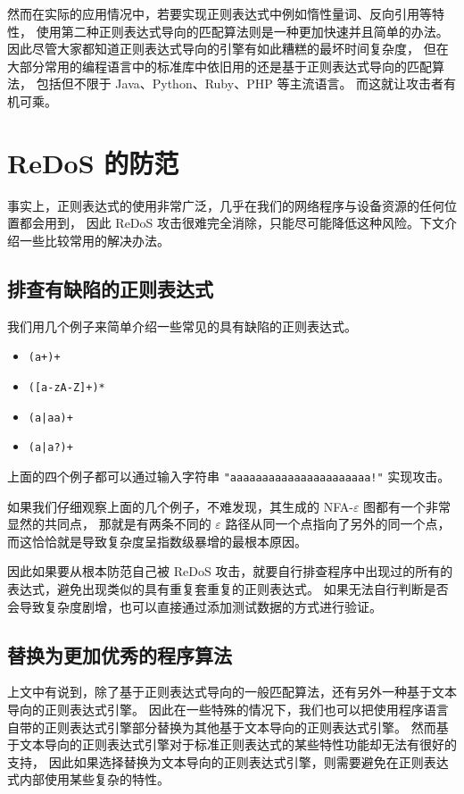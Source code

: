 \documentclass[hyperref,UTF8,12pt,a4paper]{ctexart}
\begin{document}
然而在实际的应用情况中，若要实现正则表达式中例如惰性量词、反向引用等特性，
使用第二种正则表达式导向的匹配算法则是一种更加快速并且简单的办法。
因此尽管大家都知道正则表达式导向的引擎有如此糟糕的最坏时间复杂度，
但在大部分常用的编程语言中的标准库中依旧用的还是基于正则表达式导向的匹配算法，
包括但不限于 Java、Python、Ruby、PHP 等主流语言。
而这就让攻击者有机可乘。

\section{ReDoS 的防范}

事实上，正则表达式的使用非常广泛，几乎在我们的网络程序与设备资源的任何位置都会用到，
因此 ReDoS 攻击很难完全消除，只能尽可能降低这种风险。下文介绍一些比较常用的解决办法。

\subsection{排查有缺陷的正则表达式}

我们用几个例子来简单介绍一些常见的具有缺陷的正则表达式。

\begin{itemize}
	\item \verb|(a+)+|
	\item \verb|([a-zA-Z]+)*|
	\item \verb!(a|aa)+!
	\item \verb!(a|a?)+!
\end{itemize}

上面的四个例子都可以通过输入字符串 \verb|"aaaaaaaaaaaaaaaaaaaaaa!"| 实现攻击。

如果我们仔细观察上面的几个例子，不难发现，其生成的 NFA-$\varepsilon$ 图都有一个非常显然的共同点，
那就是有两条不同的 $\varepsilon$ 路径从同一个点指向了另外的同一个点，
而这恰恰就是导致复杂度呈指数级暴增的最根本原因。

因此如果要从根本防范自己被 ReDoS 攻击，就要自行排查程序中出现过的所有的表达式，避免出现类似的具有重复套重复的正则表达式。
如果无法自行判断是否会导致复杂度剧增，也可以直接通过添加测试数据的方式进行验证。

\subsection{替换为更加优秀的程序算法}

上文中有说到，除了基于正则表达式导向的一般匹配算法，还有另外一种基于文本导向的正则表达式引擎。
因此在一些特殊的情况下，我们也可以把使用程序语言自带的正则表达式引擎部分替换为其他基于文本导向的正则表达式引擎。
然而基于文本导向的正则表达式引擎对于标准正则表达式的某些特性功能却无法有很好的支持，
因此如果选择替换为文本导向的正则表达式引擎，则需要避免在正则表达式内部使用某些复杂的特性。
\end{document}
